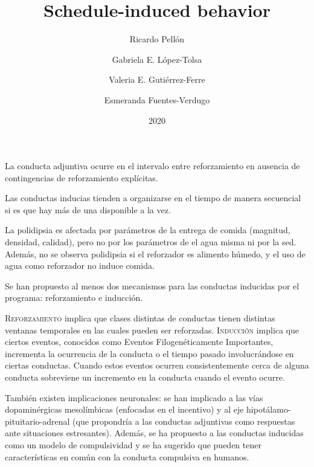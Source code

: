 \documentclass[a4paper,12pt]{article}
\title{Schedule-induced behavior}
\author{Ricardo Pellón \and Gabriela E. López-Tolsa \and Valeria E. Gutiérrez-Ferre \and Esmeranda Fuentes-Verdugo}
\date{2020}
\begin{document}
{\scshape\bfseries \maketitle}

La conducta adjuntiva ocurre en el intervalo entre reforzamiento en ausencia de contingencias de reforzamiento explícitas.

Las conductas inducias tienden a organizarse en el tiempo de manera secuencial si es que hay más de una disponible a la vez.

La polidipsia es afectada por parámetros de la entrega de comida (magnitud, densidad, calidad), pero no por los parámetros de el agua misma ni por la sed. Además, no se observa polidipsia si el reforzador es alimento húmedo, y el uso de agua como reforzador no induce comida.

Se han propuesto al menos dos mecanismos para las conductas inducidas por el programa: reforzamiento e inducción.

{\scshape Reforzamiento} implica que clases distintas de conductas tienen distintas ventanas temporales en las cuales pueden ser reforzadas. {\scshape Inducción} implica que ciertos eventos, conocidos como Eventos Filogenéticamente Importantes, incrementa la ocurrencia de la conducta o el tiempo pasado involucrándose en ciertas conductas. Cuando estos eventos ocurren consistentemente cerca de alguna conducta sobreviene un incremento en la conducta cuando el evento ocurre.

También existen implicaciones neuronales: se han implicado a las vías dopaminérgicas mesolímbicas (enfocadas en el incentivo) y al eje hipotálamo-pituitario-adrenal (que propondría a las conductas adjuntivas como respuestas ante situaciones estresantes). Además, se ha propuesto a las conductas inducidas como un modelo de compulsividad y se ha sugerido que pueden tener características en común con la conducta compulsiva en humanos.
\end{document}
